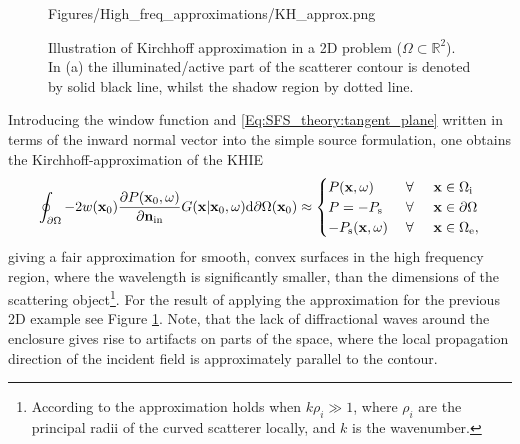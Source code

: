 \begin{figure}
	\centering
	\begin{overpic}[width = 1\columnwidth]{Figures/High_freq_approximations/KH_approx.png}
	\end{overpic}
\caption{Illustration of Kirchhoff approximation in a 2D problem ($\Omega \subset \mathbb{R}^2$). 
In (a) the illuminated/active part of the scatterer contour is denoted by solid black line, whilst the shadow region by dotted line.}
	\label{Fig:Theory:KH_approximation}
\end{figure}
%
Introducing the window function and \eqref{Eq:SFS_theory:tangent_plane} written in terms of the inward normal vector into the simple source formulation, one obtains the Kirchhoff-approximation of the KHIE
\begin{equation}
\oint_{\partial \Omega} 
- 2w(\mathbf{x}_0)\frac{\partial P(\mathbf{x}_0,\omega)}{\partial \mathbf{n}_{\mathrm{in}}} 
G(\mathbf{x}|\mathbf{x}_0,\omega) 
\mathrm{d} \partial \Omega ( \mathbf{x}_0)
\approx
\begin{cases} 
P(\mathbf{x},\omega)     & \hspace{1mm} \forall \hspace{5mm}   \mathbf{x} \in \Omega_{\mathrm{i}} \\
P=-P_{\mathrm{s}}  & \hspace{1mm} \forall \hspace{5mm}         \mathbf{x} \in \partial \Omega  \\
-P_{\mathrm{s}}(\mathbf{x},\omega)    & \hspace{1mm} \forall \hspace{5mm}  \mathbf{x} \in \Omega_{\mathrm{e}},
\end{cases}
\label{Eq:SFS_theory:Kirchhoff_appr}
\end{equation}
giving a fair approximation for smooth, convex surfaces in the high frequency region, where the wavelength is significantly smaller, than the dimensions of the scattering object\footnote{According to \cite[Eq.(2.7.12)]{Blenstein1975} the approximation holds when $k\rho_i \gg 1$, where $\rho_i$ are the principal radii of the curved scatterer locally, and $k$ is the wavenumber.}. For the result of applying the approximation for the previous 2D example see Figure \ref{Fig:Theory:KH_approximation}. Note, that the lack of diffractional waves around the enclosure gives rise to artifacts on parts of the space, where the local propagation direction of the incident field is approximately parallel to the contour.

